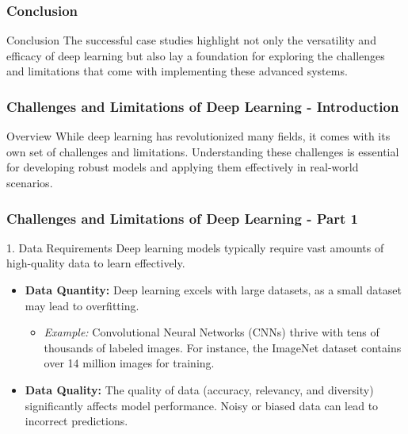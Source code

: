 \documentclass[aspectratio=169]{beamer}
\begin{document}
\begin{frame}[fragile]
    \frametitle{Conclusion}
    \begin{block}{Conclusion}
        The successful case studies highlight not only the versatility and efficacy of deep learning but also lay a foundation for exploring the challenges and limitations that come with implementing these advanced systems.
    \end{block}
\end{frame}

\begin{frame}[fragile]
    \frametitle{Challenges and Limitations of Deep Learning - Introduction}
    \begin{block}{Overview}
        While deep learning has revolutionized many fields, it comes with its own set of challenges and limitations. Understanding these challenges is essential for developing robust models and applying them effectively in real-world scenarios.
    \end{block}
\end{frame}

\begin{frame}[fragile]
    \frametitle{Challenges and Limitations of Deep Learning - Part 1}
    \begin{block}{1. Data Requirements}
        Deep learning models typically require vast amounts of high-quality data to learn effectively.
        
        \begin{itemize}
            \item \textbf{Data Quantity:} Deep learning excels with large datasets, as a small dataset may lead to overfitting.
            \begin{itemize}
                \item \textit{Example:} Convolutional Neural Networks (CNNs) thrive with tens of thousands of labeled images. For instance, the ImageNet dataset contains over 14 million images for training.
            \end{itemize}
            
            \item \textbf{Data Quality:} The quality of data (accuracy, relevancy, and diversity) significantly affects model performance. Noisy or biased data can lead to incorrect predictions.
        \end{itemize}
    \end{block}
\end{frame}
\end{document}
